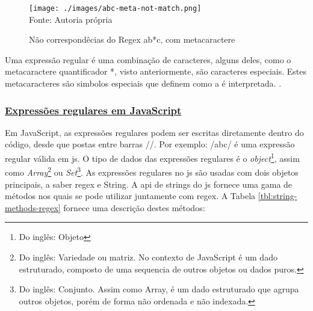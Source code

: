 \begin{figure}[H]
    \centering
    \caption{Não correspondêcias do Regex ab*c, com metacaractere}
    \texttt{[image: ./images/abc-meta-not-match.png]}
    \label{fig:abc-meta-not-match} \\
    \textnormal{\fontsize{10pt}{12pt}Fonte: Autoria própria}
\end{figure}

Uma expressão regular é uma combinação de caracteres, alguns
deles, como o metacaractere quantificador *, visto
anteriormente, são caracteres especiais. Estes metacaracteres
são simbolos especiais que definem como a é interpretada.
\cite{dp6-regex}.

\subsubsection{\underline{Expressões regulares em JavaScript}}

Em JavaScript, as expressões regulares podem ser escritas diretamente dentro do código,
desde que postas entre barras //. Por exemplo: /abc/ é uma expressão regular válida em
\acrshort{js}.
O tipo de dados das expressões regulares é
o
\textit{object}\footnote{Do inglês: Objeto
}, assim como
\textit{Array}\footnote{Do inglês: Variedade ou matriz. No contexto de JavaScript é um dado estruturado,
    composto de uma sequencia de outros objetos ou dados puros.
}
ou
\textit{Set}\footnote{Do inglês: Conjunto. Assim como Array, é um dado estruturado que agrupa outros
    objetos, porém de forma não ordenada e não indexada.
}. As expressões regulares no
\acrshort{js}
são usadas com dois objetos principais, a saber
\acrshort{regex}
e
String.
A
\acrshort{api}
de strings do
\acrshort{js}
fornece uma gama de métodos nos quais se pode utilizar
juntamente com
\acrshort{regex}.
A Tabela \ref{tbl:string-methods-regex}
fornece uma descrição destes métodos:


